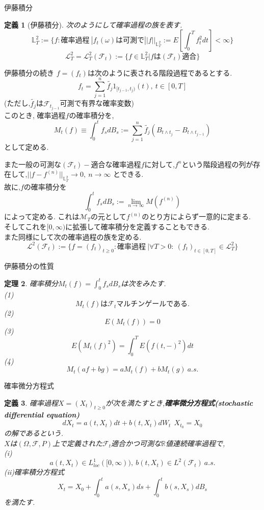 \documentclass[dvipdfmx,cjk]{beamer}
\numberwithin{equation}{section}
\newtheorem{Thm}     {定理}[section]
\newtheorem{Def}     [Thm]{定義}
\def\R{\mathbb R}
\def\F{\mathcal F}
\def\thm{\begin{Thm}}
\def\thmx{\end{Thm}}
\def\defb{\begin{Def}}
\def\defx{\end{Def}}
\def\eq{\begin{equation}}
\def\eqx{\end{equation}}
\def\bbL{\mathbb L}
\def\calL{\mathcal L}
\begin{document}
\begin{frame}{伊藤積分}
\defb[伊藤積分]
次のようにして確率過程の族を表す.\\
\[
\bbL_T^2 := \{f:\mbox{確率過程}\  | f_t(\omega)\mbox{は可測で}||f||_{\bbL_T^2}:= E[\int_{0}^T f_t^2 dt] < \infty \}
\]
\[
\calL_T^2 = \calL_T^2 (\F_t) := \{ f \in \bbL_T^2 | f\mbox{は}(\F_t)\mbox{適合}\}
\]
\defx
\end{frame}

\begin{frame}{伊藤積分の続き}
$f=(f_t)$は次のように表される階段過程であるとする.\\
\[
f_t = \sum_{j=1}^n \tilde{f_j} 1_{[t_{j-1},t_j)}(t) ,\ t\in [0,T]
\]
(ただし,$\tilde{f_j}$は$\F_{t_{j-1}}$可測で有界な確率変数)\\
このとき, 確率過程$f$の確率積分を,
\[
M_t(f) \equiv \int_0^t f_s dB_s := \sum_{j=1}^n \tilde{f_j} (B_{t\wedge t_j} - B_{t\wedge t_{j-1}})
\]
として定める.
\end{frame}


\begin{frame}
また一般の可測な$(\F_t)-$適合な確率過程$f$に対して,$f^n$という階段過程の列が存在して,$||f-f^{(n)}||_{\bbL_T^2} \to 0 ,\ n\to \infty$
とできる.\\
故に,$f$の確率積分を
\[
\int_0^t f_sdB_s := \lim_{n\to\infty} M(f^{(n)})
\]
によって定める.
これは$\mathcal M _T$の元として$f^{(n)}$のとり方によらず一意的に定まる.\\
そしてこれを$[0,\infty)$に拡張して確率積分を定義することもできる.\\
また同様にして次の確率過程の族を定める.\\
\[
\calL^2(\F_t) := \{f=(f_t)_{t\ge 0}:\mbox{確率過程}\  | \forall T>0 : \ (f_t)_{t\in [0,T]} \in \calL^2_T \}
\]


\end{frame}


\begin{frame}{伊藤積分の性質}
\thm
確率積分$M_t(f) = \int_0^t f_sdB_s$は次をみたす.\\
(1)\[M_t(f)\mbox{は} \F_t \mbox{マルチンゲールである.}\]
(2)\[E(M_t(f))=0\]
(3)\[E(M_t(f)^2) = \int_0^T E(f(t,-)^2)dt\]
(4)\[M_t(af+bg) = aM_t(f)+bM_t(g)\ a.s.\]
\thmx
\end{frame}


\begin{frame}{確率微分方程式}
\defb
確率過程$X = (X_t)_{t\ge 0}$が次を満たすとき,{\bf 確率微分方程式(stochastic differential equation)}
\eq
dX_t = a(t,X_t)dt + b(t,X_t)dW_t \ \ X_{t_0} =X_0
\eqx
の解であるという.\\
$X$は$(\Omega,\F,P)$上で定義された$\F_t$適合かつ可測な$\R$値連続確率過程で,\\
(i)
\[
  a(t,X_t) \in L^1_{loc} ([0,\infty)),\  b(t,X_t) \in L^2(\F_t)\  a.s.
\]
(ii)確率積分方程式
\[
X_t = X_0 + \int_0^t a(s,X_s)ds +  \int_0^t b(s,X_s)dB_s
\]
を満たす.
\defx
\end{frame}
\end{document}

